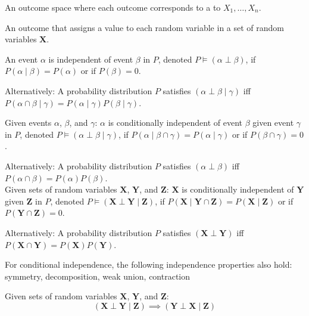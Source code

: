 {%
  An \gls{outcome space} where each outcome corresponds to a  to $X_1,\dots, X_n$.
}

{%
  An outcome that assigns a value to each \gls{random variable} in a set of random variables $\bm{X}$.
}

{%
  An event $\alpha$ is independent of event $\beta$ in $P$, denoted $P\models(\alpha\perp\beta)$, if $P(\alpha\mid\beta)=P(\alpha)$ or if $P(\beta)=0$.

  Alternatively: A \gls{probability distribution} $P$ satisfies $(\alpha\perp\beta\mid\gamma)$ \acrshort{iff} $P(\alpha\cap\beta\mid\gamma)=P(\alpha\mid\gamma)P(\beta\mid\gamma)$.
}

{%
  Given events $\alpha$, $\beta$, and $\gamma$: $\alpha$ is conditionally independent of event $\beta$ given event $\gamma$ in $P$, denoted $P\models(\alpha\perp\beta\mid\gamma)$, if $P(\alpha\mid\beta\cap\gamma)=P(\alpha\mid\gamma)$ or if $P(\beta\cap\gamma)=0$.

  Alternatively: A \gls{probability distribution} $P$ satisfies $(\alpha\perp\beta)$ \acrshort{iff} $P(\alpha\cap\beta)=P(\alpha)P(\beta)$.\\[0.1cm]

  Given sets of random variables $\bm{X}$, $\bm{Y}$, and $\bm{Z}$: $\bm{X}$ is conditionally independent of $\bm{Y}$ given $\bm{Z}$ in $P$, denoted $P\models(\bm{X}\perp\bm{Y}\mid\bm{Z})$, if $P(\bm{X}\mid\bm{Y}\cap\bm{Z})=P(\bm{X}\mid\bm{Z})$ or if $P(\bm{Y}\cap\bm{Z})=0$.

  Alternatively: A \gls{probability distribution} $P$ satisfies $(\bm{X}\perp\bm{Y})$ \acrshort{iff} $P(\bm{X}\cap\bm{Y})=P(\bm{X})P(\bm{Y})$.

  For conditional independence, the following independence properties also hold: \gls{symmetry}, \gls{decomposition}, \gls{weak union}, \gls{contraction}
}

{%
  Given sets of random variables $\bm{X}$, $\bm{Y}$, and $\bm{Z}$:
  \begin{equation*}
    (\bm{X}\perp\bm{Y}\mid\bm{Z})\implies(\bm{Y}\perp\bm{X}\mid\bm{Z})
  \end{equation*}
}

